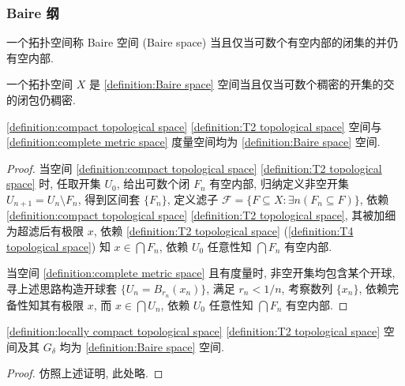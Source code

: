 \subsubsection{Baire 纲}

\begin{definition}[Baire 空间]
    \label {definition:Baire space}
    一个拓扑空间称 Baire 空间 (Baire space) 当且仅当可数个有空内部的闭集的并仍有空内部.
\end{definition}

\begin{corollary}
    一个拓扑空间 \(X\) 是 \ref{definition:Baire space} 空间当且仅当可数个稠密的开集的交的闭包仍稠密.
\end{corollary}

\begin{theorem}[Baire 纲]
    \ref{definition:compact topological space} \ref{definition:T2 topological space} 空间与
    \ref{definition:complete metric space} 度量空间均为 \ref{definition:Baire space} 空间.

    \begin{proof}
        当空间 \ref{definition:compact topological space} \ref{definition:T2 topological space} 时, 任取开集 \(U_0\), 给出可数个闭 \(F_n\) 有空内部, 归纳定义非空开集 \(U_{n+1} = U_n \setminus F_n\),
        得到区间套 \(\{F_n\}\), 定义滤子 \(\mathcal{F} = \{F \subseteq X : \exists n (F_n \subseteq F)\}\),
        依赖 \ref{definition:compact topological space} \ref{definition:T2 topological space}, 其被加细为超滤后有极限 \(x\),
        依赖 \ref{definition:T2 topological space} (\ref{definition:T4 topological space}) 知 \(x \in \bigcap F_n\), 依赖 \(U_0\) 任意性知 \(\bigcap F_n\) 有空内部.

        当空间 \ref{definition:complete metric space} 且有度量时, 非空开集均包含某个开球, 寻上述思路构造开球套 \(\{U_n = B_{r_n} (x_n)\}\), 满足 \(r_n < 1/n\),
        考察数列 \(\{x_n\}\), 依赖完备性知其有极限 \(x\), 而 \(x \in \bigcap U_n\), 依赖 \(U_0\) 任意性知 \(\bigcap F_n\) 有空内部.
    \end{proof}
\end{theorem}

\begin{theorem}
    \ref{definition:locally compact topological space} \ref{definition:T2 topological space} 空间及其 \(G_\delta\) 均为 \ref{definition:Baire space} 空间.

    \begin{proof}
        仿照上述证明, 此处略.
    \end{proof}
\end{theorem}


